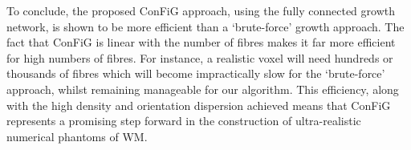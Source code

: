 To conclude, the proposed ConFiG approach, using the fully connected growth network, is shown to be more efficient than a `brute-force' growth approach.
The fact that ConFiG is linear with the number of fibres makes it far more efficient for high numbers of fibres. For instance, a realistic voxel will need hundreds or thousands of fibres which will become impractically slow for the `brute-force' approach, whilst remaining manageable for our algorithm.
This efficiency, along with the high density and orientation dispersion achieved means that ConFiG represents a promising step forward in the construction of ultra-realistic numerical phantoms of WM.


